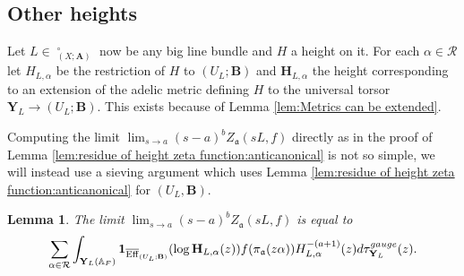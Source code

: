 \documentclass[a4paper,11pt,reqno]{amsart}
\newcommand{\A}{\mathbb{A}}
\DeclareMathOperator{\Eff}{\overline{Eff}}
\newtheorem{lemma}[theorem]{Lemma}
\theoremstyle{definition}
\begin{document}
\subsection{Other heights}
Let $L \in \Eff_{(X ; \mathbf{A})}^{\circ}$ now be any big line bundle and $H$ a height on it. For each $\alpha \in \mathcal{R}$ let $H_{L, \alpha}$ be the restriction of $H$ to $(U_L ; \mathbf{B})$ and $\mathbf{H}_{L, \alpha}$ the height corresponding to an extension of the adelic metric defining $H$ to the universal torsor $\mathbf{Y}_L \to (U_L ; \mathbf{B})$. This exists because of Lemma \ref{lem:Metrics can be extended}.

Computing the limit $\lim_{s \to a} (s - a)^b Z_{\mathfrak{a}}(s L, f)$ directly as in the proof of Lemma \ref{lem:residue of height zeta function:anticanonical} is not so simple, we will instead use a sieving argument which uses Lemma \ref{lem:residue of height zeta function:anticanonical} for $(U_L, \mathbf{B})$.
\begin{lemma}
	The limit $\lim_{s \to a} (s - a)^b Z_{\mathfrak{a}}(s L, f)$ is equal to
	\[
	\sum_{\alpha \in \mathcal{R}} \int_{\mathbf{Y}_L(\A_F)} \mathbf{1}_{\Eff_{(U_L ; \mathbf{B})}}(\log \mathbf{H}_{L, \alpha}(z)) f(\pi_{\mathfrak{a}}(z \alpha)) H_{L, \alpha}^{-(a + 1)}(z) d\tau_{\mathbf{Y}_L}^{\emph{gauge}}(z).
	\]
\end{lemma}
\end{document}
